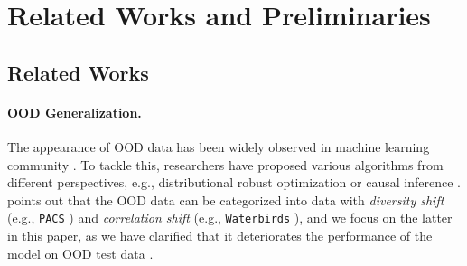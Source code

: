 \documentclass{article} %
\newcommand{\cO}{\mathcal{O}}
\begin{document}
	
	\section{Related Works and Preliminaries}
	\subsection{Related Works} 
	\paragraph{OOD Generalization.} The appearance of OOD data \citep{hendrycks2018benchmarking} has been widely observed in machine learning community \citep{recht2019imagenet,schneider2020improving,salman2020unadversarial,tu2020empirical,lohn2020estimating}. To tackle this, researchers have proposed various algorithms from different perspectives, e.g., distributional robust optimization \citep{sinha2018certifying,volpi2018generalizing,sagawa2019distributionally,yi2021improved,levy2020large} or causal inference \citep{arjovsky2019invariant,he2021towards,liu2021heterogeneous,mahajan2021domain,wang2022out,ye2021towards}. \cite{ye2021ood} points out that the OOD data can be categorized into data with \emph{diversity shift} (e.g., \texttt{PACS} \citep{li2018deep}) and \emph{correlation shift} (e.g., \texttt{Waterbirds} \citep{sagawa2019distributionally}), and we focus on the latter in this paper, as we have clarified that it deteriorates the performance of the model on OOD test data \citep{geirhos2018imagenet,beery2018recognition,xie2020in,wald2021calibration}.  
	
\end{document}
